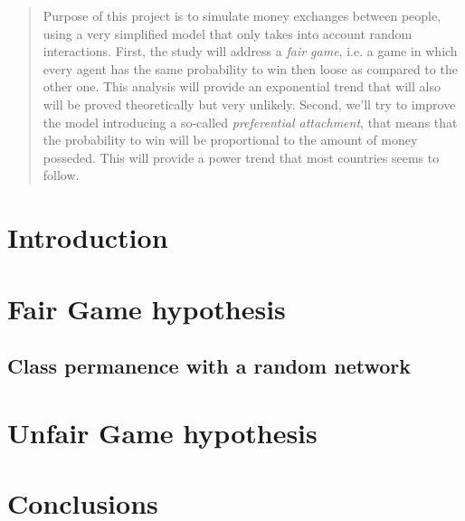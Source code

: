 \documentclass[12pt,a4paper]{article}
\title{}
\author{Simone Balducci, Gregorio Berselli}
\date{}
\begin{document}
\maketitle

\begin{abstract}
    Purpose of this project is to simulate money exchanges between people, using a very simplified model that only takes into account random interactions.
    First, the study will address a \emph{fair game}, i.e. a game in which every agent has the same probability to win then loose as compared to the other one.
    This analysis will provide an exponential trend that will also will be proved theoretically but very unlikely.
    Second, we'll try to improve the model introducing a so-called \emph{preferential attachment}, that means that the probability to win will be proportional to the amount of money posseded.
    This will provide a power trend that most countries seems to follow.
\end{abstract}

\newpage
\thispagestyle{empty}
\addtocounter{page}{-2}
\mbox{}

\tableofcontents
\pagebreak

\section{Introduction}


\section{Fair Game hypothesis}


\subsection{Class permanence with a random network}


\section{Unfair Game hypothesis}


\section{Conclusions}


\newpage
\thispagestyle{empty}
\mbox{}

\printbibliography
\end{document}
